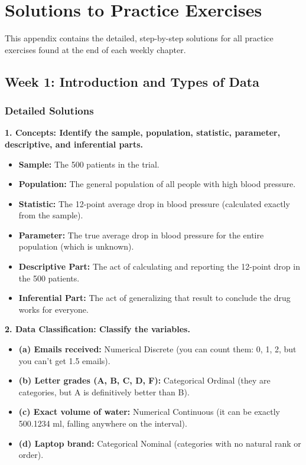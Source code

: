 \appendix
\chapter{Solutions to Practice Exercises}

This appendix contains the detailed, step-by-step solutions for all practice exercises found at the end of each weekly chapter.

\section*{Week 1: Introduction and Types of Data}

\subsection*{Detailed Solutions}

\textbf{1. Concepts: Identify the sample, population, statistic, parameter, descriptive, and inferential parts.}
\begin{itemize}
    \item \textbf{Sample:} The 500 patients in the trial.
    \item \textbf{Population:} The general population of all people with high blood pressure.
    \item \textbf{Statistic:} The 12-point average drop in blood pressure (calculated exactly from the sample).
    \item \textbf{Parameter:} The true average drop in blood pressure for the entire population (which is unknown).
    \item \textbf{Descriptive Part:} The act of calculating and reporting the 12-point drop in the 500 patients.
    \item \textbf{Inferential Part:} The act of generalizing that result to conclude the drug works for everyone.
\end{itemize}

\textbf{2. Data Classification: Classify the variables.}
\begin{itemize}
    \item \textbf{(a) Emails received:} Numerical Discrete (you can count them: 0, 1, 2, but you can't get 1.5 emails).
    \item \textbf{(b) Letter grades (A, B, C, D, F):} Categorical Ordinal (they are categories, but A is definitively better than B).
    \item \textbf{(c) Exact volume of water:} Numerical Continuous (it can be exactly 500.1234 ml, falling anywhere on the interval).
    \item \textbf{(d) Laptop brand:} Categorical Nominal (categories with no natural rank or order).
\end{itemize}

